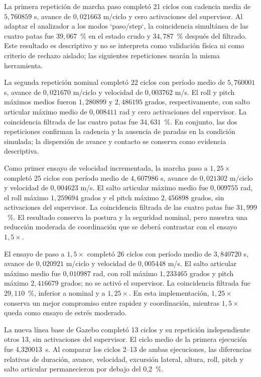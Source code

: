 La primera repetición de marcha paso completó 21 ciclos con cadencia media de
$5{,}760859$ s, avance de $0{,}021663$ m/ciclo y cero activaciones del
supervisor. Al adaptar el analizador a los modos `paso/step`, la coincidencia
simultánea de las cuatro patas fue $39{,}067$~\% en el estado crudo y
$34{,}787$~\% después del filtrado. Este resultado es descriptivo y no se
interpreta como validación física ni como criterio de rechazo aislado; las
siguientes repeticiones usarán la misma herramienta.

La segunda repetición nominal completó 22 ciclos con período medio de
$5{,}760001$ s, avance de $0{,}021670$ m/ciclo y velocidad de
$0{,}003762$ m/s. El roll y pitch máximos medios fueron $1{,}280899$ y
$2{,}486195$ grados, respectivamente, con salto articular máximo medio de
$0{,}008411$ rad y cero activaciones del supervisor. La coincidencia filtrada
de las cuatro patas fue $34{,}631$~\%. En conjunto, las dos repeticiones
confirman la cadencia y la ausencia de paradas en la condición simulada; la
dispersión de avance y contacto se conserva como evidencia descriptiva.

Como primer ensayo de velocidad incrementada, la marcha paso a $1{,}25\times$
completó 25 ciclos con período medio de $4{,}607986$ s, avance de
$0{,}021302$ m/ciclo y velocidad de $0{,}004623$ m/s. El salto articular máximo
medio fue $0{,}009755$ rad, el roll máximo $1{,}259694$ grados y el pitch máximo
$2{,}456898$ grados, sin activaciones del supervisor. La coincidencia filtrada
de las cuatro patas fue $31{,}999$~\%. El resultado conserva la postura y la
seguridad nominal, pero muestra una reducción moderada de coordinación que se
deberá contrastar con el ensayo $1{,}5\times$.

El ensayo de paso a $1{,}5\times$ completó 26 ciclos con período medio de
$3{,}840720$ s, avance de $0{,}020921$ m/ciclo y velocidad de $0{,}005448$ m/s.
El salto articular máximo medio fue $0{,}010987$ rad, con roll máximo
$1{,}233465$ grados y pitch máximo $2{,}416679$ grados; no se activó el
supervisor. La coincidencia filtrada fue $29{,}110$~\%, inferior a nominal y
a $1{,}25\times$. En esta implementación, $1{,}25\times$ conserva un mejor
compromiso entre rapidez y coordinación, mientras $1{,}5\times$ queda como
ensayo de estrés moderado.

La nueva línea base de Gazebo completó 13 ciclos y su repetición independiente
otros 13, sin activaciones del supervisor. El ciclo medio de la primera
ejecución fue 4,320013~s. Al comparar los ciclos 2--13 de ambas ejecuciones, las
diferencias relativas de duración, avance, velocidad, excursión lateral,
altura, roll, pitch y salto articular permanecieron por debajo del 0,2~\%.

